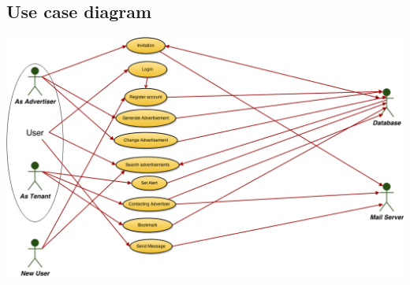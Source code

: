 \documentclass[a4paper,11pt]{article}
\begin{document}
\subsection*{Use case diagram}
\begin{center}
	\includegraphics[width=400bp]{UseCases.png}
\end{center}
\end{document}
